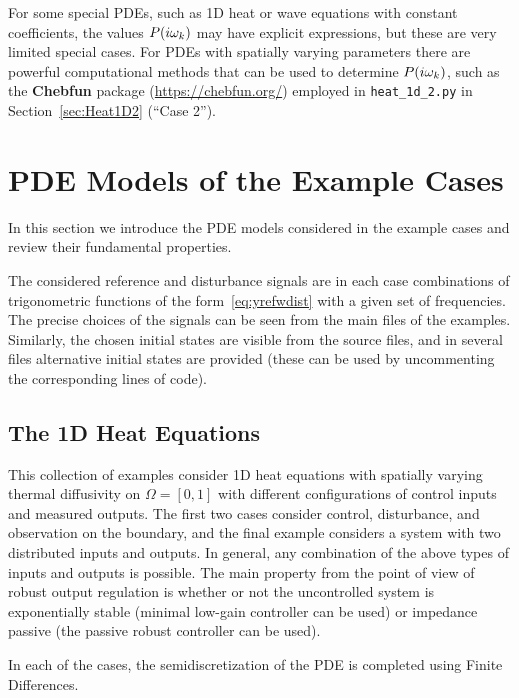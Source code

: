 \documentclass[11pt, a4paper]{amsart}
\theoremstyle{definition}
\numberwithin{equation}{section}
\begin{document}
For some special PDEs, such as 1D heat or wave equations with constant coefficients, the values $P(i\omega_k)$ may have explicit expressions, but these are very limited special cases. For PDEs with spatially varying parameters there are powerful computational methods that can be used to determine $P(i\omega_k)$, such as the \textbf{Chebfun} package (\href{https://chebfun.org/}{https://chebfun.org/}) employed in \texttt{heat\_1d\_2.py} in Section~\ref{sec:Heat1D2} (``Case 2'').



\section{PDE Models of the Example Cases}
\label{sec:PDEcases}

In this section we introduce the PDE models considered in the example cases and review their fundamental properties.

The considered reference and disturbance signals are in each case combinations of trigonometric functions of the form~\eqref{eq:yrefwdist} with a given set of frequencies. The precise choices of the signals can be seen from the main files of the examples. Similarly, the chosen initial states are visible from the source files, and in several files alternative initial states are provided (these can be used by uncommenting the corresponding lines of code).

\subsection{The 1D Heat Equations}

This collection of examples consider 1D heat equations with spatially varying thermal diffusivity on $\Omega = [0,1]$ with different configurations of control inputs and measured outputs. The first two cases consider control, disturbance, and observation on the boundary, and the final example considers a system with two distributed inputs and outputs. In general, any combination of the above types of inputs and outputs is possible. 
The main property from the point of view of robust output regulation is whether or not the uncontrolled system is exponentially stable (minimal low-gain controller can be used) or impedance passive (the passive robust controller can be used).

In each of the cases, the semidiscretization of the PDE is completed using Finite Differences.

\medskip
\end{document}
